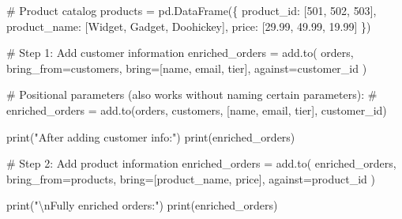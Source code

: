 \documentclass[
  letterpaper,
]{scrbook}
\newenvironment{Shaded}{\begin{snugshade}}{\end{snugshade}}
\newcommand{\BuiltInTok}[1]{\textcolor[rgb]{0.00,0.23,0.31}{#1}}
\newcommand{\CharTok}[1]{\textcolor[rgb]{0.13,0.47,0.30}{#1}}
\newcommand{\CommentTok}[1]{\textcolor[rgb]{0.37,0.37,0.37}{#1}}
\newcommand{\DecValTok}[1]{\textcolor[rgb]{0.68,0.00,0.00}{#1}}
\newcommand{\FloatTok}[1]{\textcolor[rgb]{0.68,0.00,0.00}{#1}}
\newcommand{\NormalTok}[1]{\textcolor[rgb]{0.00,0.23,0.31}{#1}}
\newcommand{\OperatorTok}[1]{\textcolor[rgb]{0.37,0.37,0.37}{#1}}
\newcommand{\StringTok}[1]{\textcolor[rgb]{0.13,0.47,0.30}{#1}}
\begin{document}
\begin{Shaded}
\begin{Highlighting}[]
\CommentTok{\# Product catalog}
\NormalTok{products }\OperatorTok{=}\NormalTok{ pd.DataFrame(\{}
    \StringTok{\textquotesingle{}product\_id\textquotesingle{}}\NormalTok{: [}\DecValTok{501}\NormalTok{, }\DecValTok{502}\NormalTok{, }\DecValTok{503}\NormalTok{],}
    \StringTok{\textquotesingle{}product\_name\textquotesingle{}}\NormalTok{: [}\StringTok{\textquotesingle{}Widget\textquotesingle{}}\NormalTok{, }\StringTok{\textquotesingle{}Gadget\textquotesingle{}}\NormalTok{, }\StringTok{\textquotesingle{}Doohickey\textquotesingle{}}\NormalTok{],}
    \StringTok{\textquotesingle{}price\textquotesingle{}}\NormalTok{: [}\FloatTok{29.99}\NormalTok{, }\FloatTok{49.99}\NormalTok{, }\FloatTok{19.99}\NormalTok{]}
\NormalTok{\})}

\CommentTok{\# Step 1: Add customer information}
\NormalTok{enriched\_orders }\OperatorTok{=}\NormalTok{ add.to(}
\NormalTok{    orders,}
\NormalTok{    bring\_from}\OperatorTok{=}\NormalTok{customers,}
\NormalTok{    bring}\OperatorTok{=}\NormalTok{[}\StringTok{\textquotesingle{}name\textquotesingle{}}\NormalTok{, }\StringTok{\textquotesingle{}email\textquotesingle{}}\NormalTok{, }\StringTok{\textquotesingle{}tier\textquotesingle{}}\NormalTok{],}
\NormalTok{    against}\OperatorTok{=}\StringTok{\textquotesingle{}customer\_id\textquotesingle{}}
\NormalTok{)}

\CommentTok{\# Positional parameters (also works without naming certain parameters):}
\CommentTok{\# enriched\_orders = add.to(orders, customers, [\textquotesingle{}name\textquotesingle{}, \textquotesingle{}email\textquotesingle{}, \textquotesingle{}tier\textquotesingle{}], \textquotesingle{}customer\_id\textquotesingle{})}

\BuiltInTok{print}\NormalTok{(}\StringTok{"After adding customer info:"}\NormalTok{)}
\BuiltInTok{print}\NormalTok{(enriched\_orders)}

\CommentTok{\# Step 2: Add product information}
\NormalTok{enriched\_orders }\OperatorTok{=}\NormalTok{ add.to(}
\NormalTok{    enriched\_orders,}
\NormalTok{    bring\_from}\OperatorTok{=}\NormalTok{products,}
\NormalTok{    bring}\OperatorTok{=}\NormalTok{[}\StringTok{\textquotesingle{}product\_name\textquotesingle{}}\NormalTok{, }\StringTok{\textquotesingle{}price\textquotesingle{}}\NormalTok{],}
\NormalTok{    against}\OperatorTok{=}\StringTok{\textquotesingle{}product\_id\textquotesingle{}}
\NormalTok{)}

\BuiltInTok{print}\NormalTok{(}\StringTok{"}\CharTok{\textbackslash{}n}\StringTok{Fully enriched orders:"}\NormalTok{)}
\BuiltInTok{print}\NormalTok{(enriched\_orders)}


\end{Highlighting}
\end{Shaded}
\end{document}

